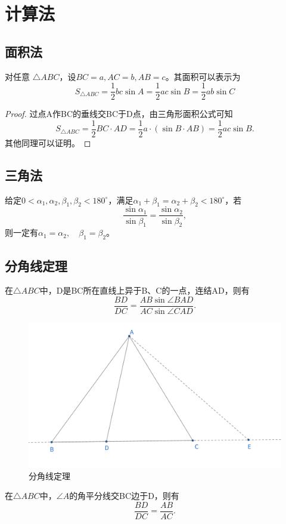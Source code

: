 \section{计算法}
\subsection{面积法}
\begin{proposition}
    对任意 $\triangle ABC$，设$BC=a,AC=b,AB=c$。其面积可以表示为
    $$S_{\triangle ABC} =\frac{1}{2}bc\sin A=\frac{1}{2}ac\sin B=\frac{1}{2}ab\sin C$$
\end{proposition}
\begin{proof}
    过点A作BC的垂线交BC于D点，由三角形面积公式可知
    $$S_{\triangle ABC} = \frac{1}{2} BC \cdot AD = \frac{1}{2} a \cdot (\sin B \cdot AB) = \frac{1}{2} ac \sin B.$$
    其他同理可以证明。
\end{proof}


\subsection{三角法}
\begin{proposition}
    给定$0<\alpha_1,\alpha_2,\beta_1,\beta_2<180^\circ$，满足$\alpha_1+\beta_1=\alpha_2+\beta_2 < 180^\circ$，若
    $$
    \frac{\sin\alpha_1}{\sin\beta_1}= \frac{\sin\alpha_2}{\sin\beta_2},
    $$
    则一定有$\alpha_1=\alpha_2,\quad \beta_1 =\beta_2$。
\end{proposition}


\newpage 
\subsection{分角线定理}
\begin{theorem}[分角线定理]
    在$\triangle ABC$中，D是BC所在直线上异于B、C的一点，连结AD，则有
    $$
    \frac{BD}{DC} = \frac{AB\sin \angle BAD}{AC \sin \angle CAD}.
    $$
\end{theorem}
\begin{figure}[ht]
    \centering
    \includegraphics[width=0.7\linewidth]{figures/分角线定理.png}
    \caption{分角线定理}
\end{figure}
\begin{proposition}[角平分线定理]
在$\triangle ABC$中，$\angle A$的角平分线交BC边于D，则有
    $$
    \frac{BD}{DC} = \frac{AB}{AC}.
    $$
\end{proposition}

